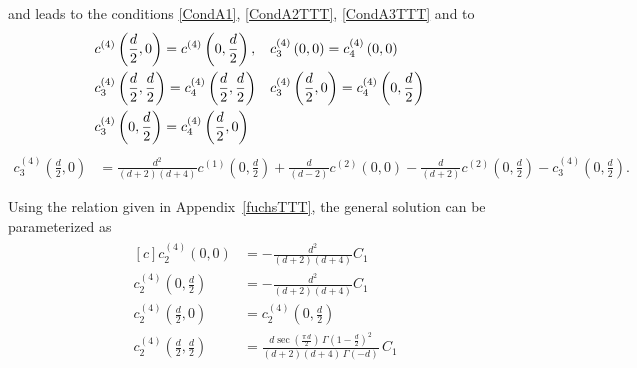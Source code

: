 \documentclass[a4paper,11pt,openright,twoside]{book}
\newcommand{\appref}[1]{Appendix~\ref{#1}}		%
\numberwithin{equation}{section}
\begin{document}
{{\begin{equation}
\end{equation}
and leads to the conditions \eqref{CondA1}, \eqref{CondA2TTT}, \eqref{CondA3TTT} and to
\begin{align}
&c^{(4)}\left(\frac{d}{2},0\right)=c^{(4)}\left(0,\frac{d}{2}\right),&&c_3^{(4)}\left(0,0\right)=c_4^{(4)}\left(0,0\right)\notag\\
&c_3^{(4)}\left(\frac{d}{2},\frac{d}{2}\right)=c_4^{(4)}\left(\frac{d}{2},\frac{d}{2}\right)&&c_3^{(4)}\left(\frac{d}{2},0\right)=c_4^{(4)}\left(0,\frac{d}{2}\right)\notag\\
&c_3^{(4)}\left(0,\frac{d}{2}\right)=c_4^{(4)}\left(\frac{d}{2},0\right)
\end{align}
\begin{align}
c^{(4)}_3\left(\frac{d}{2},0\right)&=\frac{d^2}{ (d+2) (d+4)} c^{(1)}\left(0,\frac{d}{2}\right)+\frac{d}{(d-2) } c^{(2)}(0,0)-\frac{d}{(d+2)} c^{(2)}\left(0,\frac{d}{2}\right)- c_3^{(4)}\left(0,\frac{d}{2}\right).
\end{align}

Using the relation given in \appref{fuchsTTT}, the general solution can be parameterized as
\begin{align}
&\begin{aligned}[c]
	c_2^{(4)}\left(0,0\right)&=-\frac{d^2}{(d+2)(d+4)}C_1\\
	c_2^{(4)}\left(0,\frac{d}{2}\right)&=-\frac{d^2}{(d+2)(d+4)}C_1\\
	c_2^{(4)}\left(\frac{d}{2},0\right)&=c_2^{(4)}\left(0,\frac{d}{2}\right)\\
	c_2^{(4)}\left(\frac{d}{2},\frac{d}{2}\right)&=\frac{d\sec\left(\frac{\pi\,d}{2}\right)\,\Gamma\left(1-\frac{d}{2}\right)^2}{(d+2)(d+4)\,\Gamma(-d)}\,C_1
\end{aligned}
\label{C41}
\end{align}



}}
\end{document}
